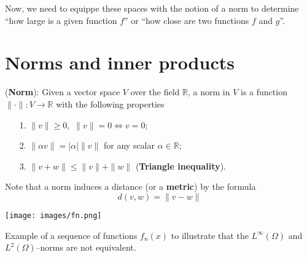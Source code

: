 Now, we need to equippe these spaces with the notion of a norm
to determine ``how large is a given function $f$''
or ``how close are two functions $f$ and $g$''.

\section{Norms and inner products}

\begin{definition} 
(\textbf{Norm}): Given a vector space $V$ over the field $\mathbb{R}$, a norm in $V$ is a function
$\parallel \cdot \parallel : V \rightarrow \mathbb{R}$ with the following properties
\begin{itemize}
\item[1.] $\parallel v \parallel \ge 0$,~$\parallel v \parallel = 0 \Leftrightarrow v = 0$; \\

\item[2.] $\parallel \alpha v \parallel = | \alpha | \parallel v \parallel $ for any scalar $\alpha \in \mathbb{R}$; \\

\item[3.] $\parallel v + w \parallel \le \parallel v \parallel + \parallel w \parallel$ (\textbf{Triangle inequality}).
\end{itemize}
\end{definition}
Note that a norm induces a distance (or a \textbf{metric}) by the formula
\begin{equation}
d(v,w) = \lVert v-w \rVert
\end{equation}

\begin{marginfigure}[0.01cm]
	\texttt{[image: images/fn.png]}
	\caption[]{Example of a sequence of functions $f_n(x)$ to illustrate
        that the $L^{\infty}(\Omega)$ and $L^2(\Omega)$--norms are not equivalent.} 
\end{marginfigure}

